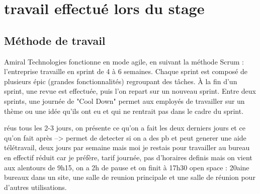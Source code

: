 \section{travail effectué lors du stage}
\subsection{Méthode de travail}
Amiral Technologies fonctionne en mode agile, en suivant la méthode Scrum : l’entreprise travaille en sprint de 4 à 6 semaines.
Chaque sprint est composé de plusieurs épic (grandes fonctionnalités) regroupant des tâches.
À la fin d’un sprint, une revue est effectuée, puis l’on repart sur un nouveau sprint.
Entre deux sprints, une journée de "Cool Down" permet aux employés de travailler sur un thème ou une idée qu’ils ont eu et qui ne rentrait pas
dans le cadre du sprint.


réus tous les 2-3 jours, on présente ce qu'on a fait les deux derniers jours et ce qu'on fait après --> permet de detecter si on a des pb et peut generer une aide 
télétravail, deux jours par semaine mais moi je restais pour travailler au bureau en effectif réduit car je préfère,
tarif journée, pas d'horaires definis mais on vient aux alentours de 9h15, on a 2h de pause et on finit à 17h30
open space : 20aine bureaux dans un site, une salle de reunion principale et une salle de réunion pour d'autres utilisations.
